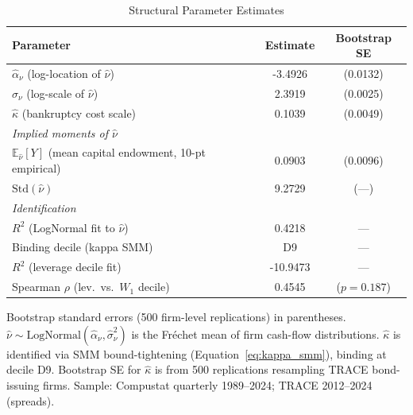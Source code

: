\begin{table}[htbp]
\centering
\caption{Structural Parameter Estimates}
\label{tab:structural}
\begin{threeparttable}
\begin{tabular}{lcc}
\toprule
Parameter & Estimate & Bootstrap SE \\
\midrule
$\hat{\alpha}_\nu$ (log-location of $\hat{\nu}$) & -3.4926 & (0.0132) \\
$\hat{\sigma}_\nu$ (log-scale of $\hat{\nu}$) & 2.3919 & (0.0025) \\
$\hat{\kappa}$ (bankruptcy cost scale) & 0.1039 & (0.0049) \\
\midrule
\multicolumn{3}{l}{\textit{Implied moments of $\hat{\nu}$}} \\
$\mathbb{E}_{\hat{\nu}}[Y]$ (mean capital endowment, 10-pt empirical) & 0.0903 & (0.0096) \\
$\text{Std}(\hat{\nu})$ & 9.2729 & (---) \\
\midrule
\multicolumn{3}{l}{\textit{Identification}} \\
$R^2$ (LogNormal fit to $\hat{\nu}$) & 0.4218 & --- \\
Binding decile (kappa SMM) & D9 & --- \\
$R^2$ (leverage decile fit) & -10.9473 & --- \\
Spearman $\rho$ (lev.\ vs.\ $W_1$ decile) & 0.4545 & ($p=0.187$) \\
\bottomrule
\end{tabular}
\begin{tablenotes}
\small
\item Bootstrap standard errors (500 firm-level replications) in parentheses.
$\hat{\nu} \sim \text{LogNormal}(\hat{\alpha}_\nu, \hat{\sigma}_\nu^2)$ is the
Fr\'{e}chet mean of firm cash-flow distributions.
$\hat{\kappa}$ is identified via SMM bound-tightening (Equation~\ref{eq:kappa_smm}),
binding at decile D9. Bootstrap SE for $\hat{\kappa}$
is from 500 replications resampling TRACE bond-issuing firms.
Sample: Compustat quarterly 1989--2024; TRACE 2012--2024 (spreads).
\end{tablenotes}
\end{threeparttable}
\end{table}